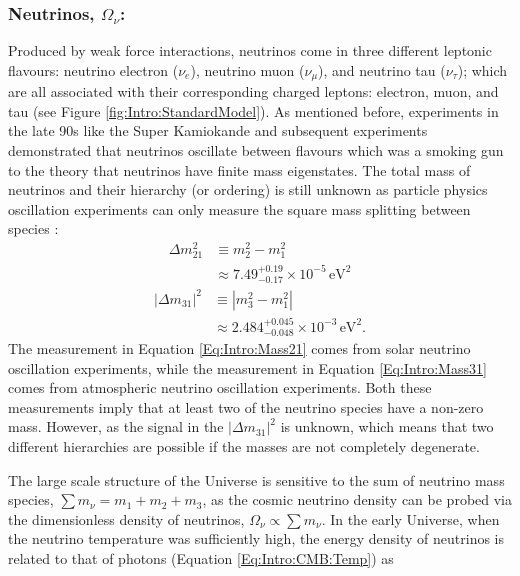 \subsubsection{Neutrinos, $\Omega_{\nu}$:}
Produced by weak force interactions, neutrinos come in three different leptonic flavours: neutrino electron ($\nu_e$), neutrino muon ($\nu_{\mu}$), and neutrino tau ($\nu_{\tau}$); which are all associated with their corresponding charged leptons: electron, muon, and tau (see Figure \ref{fig:Intro:StandardModel}). As mentioned before, experiments in the late 90s like the Super Kamiokande \citep{Kamiokande1998} and subsequent experiments \citep{2002SNO,2005KamLAND,2008MINOS,2012RENOExperiment,AbeNeutrino2014} demonstrated that neutrinos oscillate between flavours which was a smoking gun to the theory that neutrinos have finite mass eigenstates. The total mass of neutrinos and their hierarchy (or ordering) is still unknown as particle physics oscillation experiments can only measure the square mass splitting between species \citep{2014Gonzalez-GarciaNeutrino}:
\begin{align}
\Delta m_{21}^2 & \equiv m_2^2 - m_1^2 \nonumber \\ 
				& \approx 7.49^{+0.19}_{-0.17} \times 10^{-5}\, \text{eV}^2 \label{Eq:Intro:Mass21}
\end{align}
\begin{align}
|\Delta m_{31}|^2 & \equiv |m^2_3 - m_1^2| \nonumber \\ 
				  & \approx 2.484^{+0.045}_{-0.048} \times 10^{-3} \, \text{eV}^2. \label{Eq:Intro:Mass31}
\end{align}
The measurement in Equation \eqref{Eq:Intro:Mass21} comes from solar neutrino oscillation experiments, while the measurement in Equation \eqref{Eq:Intro:Mass31} comes from atmospheric neutrino oscillation experiments. Both these measurements imply that at least two of the neutrino species have a non-zero mass. However, as the signal in the $|\Delta m_{31}|^2$ is unknown, which means that two different hierarchies are possible if the masses are not completely degenerate.

\qquad The large scale structure of the Universe is sensitive to the sum of neutrino mass species, $\sum m_{\nu} = m_1 + m_2 + m_3$, as the cosmic neutrino density can be probed via the dimensionless density of neutrinos, $\Omega_{\nu} \propto \sum m_{\nu}$. In the early Universe, when the neutrino temperature was sufficiently high, the energy density of neutrinos is related to that of photons (Equation \ref{Eq:Intro:CMB:Temp}) as %

